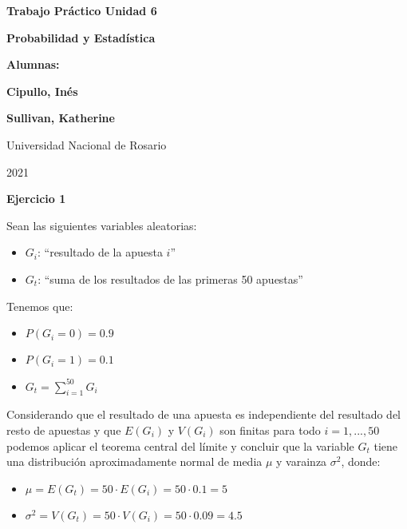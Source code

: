 \documentclass[11pt]{article}
\begin{document}
\begin{titlepage}
    \begin{center}
        \vfill
        \vfill
            \vspace{0.7cm}
            \noindent\textbf{\Huge Trabajo Pr\'actico Unidad 6}\par
            \noindent\textbf{\Huge Probabilidad y Estad\'istica}\par
            \vspace{.5cm}
        \vfill
        \noindent \textbf{\huge Alumnas:}\par
        \vspace{.5cm}
        \noindent \textbf{\Large Cipullo, In\'es}\par
        \noindent \textbf{\Large Sullivan, Katherine}\par
 
        \vfill
        \large Universidad Nacional de Rosario \par
        \noindent\large 2021
    \end{center}
\end{titlepage}
\par


\textbf{Ejercicio 1}

Sean las siguientes variables aleatorias:
\begin{itemize}
    \item $G_i$: ``resultado de la apuesta $i$''
    \item $G_t$: ``suma de los resultados de las primeras 50 apuestas''

\end{itemize}

Tenemos que:
\begin{itemize}
    \item $P(G_i = 0) = 0.9$
    \item $P(G_i = 1) = 0.1$
    \item $G_t = \sum_{i = 1}^{50} G_i$
\end{itemize}

Considerando que el resultado de una apuesta es independiente del resultado del resto de apuestas y que $E(G_i)$ y $V(G_i)$ son finitas 
para todo $i=1,...,50$ podemos aplicar el teorema central del l\'imite y concluir que la variable $G_t$ tiene una distribuci\'on 
aproximadamente normal de media $\mu$ y varainza $\sigma^2$, donde:

\begin{itemize}
    \item $\mu = E(G_t) = 50\cdot E(G_i) = 50\cdot 0.1 = 5$ 
    \item $\sigma^2 = V(G_t) = 50\cdot V(G_i) = 50\cdot 0.09 = 4.5$
\end{itemize}
\end{document}
